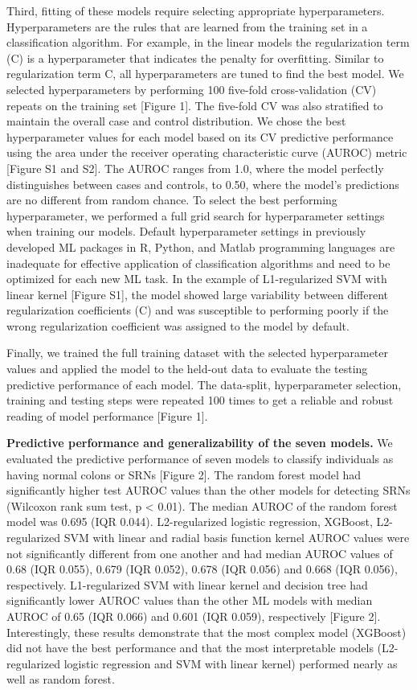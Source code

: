 \documentclass[11pt,]{article}
\begin{document}
Third, fitting of these models require selecting appropriate
hyperparameters. Hyperparameters are the rules that are learned from the
training set in a classification algorithm. For example, in the linear
models the regularization term (C) is a hyperparameter that indicates
the penalty for overfitting. Similar to regularization term C, all
hyperparameters are tuned to find the best model. We selected
hyperparameters by performing 100 five-fold cross-validation (CV)
repeats on the training set {[}Figure 1{]}. The five-fold CV was also
stratified to maintain the overall case and control distribution. We
chose the best hyperparameter values for each model based on its CV
predictive performance using the area under the receiver operating
characteristic curve (AUROC) metric {[}Figure S1 and S2{]}. The AUROC
ranges from 1.0, where the model perfectly distinguishes between cases
and controls, to 0.50, where the model's predictions are no different
from random chance. To select the best performing hyperparameter, we
performed a full grid search for hyperparameter settings when training
our models. Default hyperparameter settings in previously developed ML
packages in R, Python, and Matlab programming languages are inadequate
for effective application of classification algorithms and need to be
optimized for each new ML task. In the example of L1-regularized SVM
with linear kernel {[}Figure S1{]}, the model showed large variability
between different regularization coefficients (C) and was susceptible to
performing poorly if the wrong regularization coefficient was assigned
to the model by default.

Finally, we trained the full training dataset with the selected
hyperparameter values and applied the model to the held-out data to
evaluate the testing predictive performance of each model. The
data-split, hyperparameter selection, training and testing steps were
repeated 100 times to get a reliable and robust reading of model
performance {[}Figure 1{]}.

\textbf{Predictive performance and generalizability of the seven
models.} We evaluated the predictive performance of seven models to
classify individuals as having normal colons or SRNs {[}Figure 2{]}. The
random forest model had significantly higher test AUROC values than the
other models for detecting SRNs (Wilcoxon rank sum test, p \textless{}
0.01). The median AUROC of the random forest model was 0.695 (IQR
0.044). L2-regularized logistic regression, XGBoost, L2-regularized SVM
with linear and radial basis function kernel AUROC values were not
significantly different from one another and had median AUROC values of
0.68 (IQR 0.055), 0.679 (IQR 0.052), 0.678 (IQR 0.056) and 0.668 (IQR
0.056), respectively. L1-regularized SVM with linear kernel and decision
tree had significantly lower AUROC values than the other ML models with
median AUROC of 0.65 (IQR 0.066) and 0.601 (IQR 0.059), respectively
{[}Figure 2{]}. Interestingly, these results demonstrate that the most
complex model (XGBoost) did not have the best performance and that the
most interpretable models (L2-regularized logistic regression and SVM
with linear kernel) performed nearly as well as random forest.
\end{document}
